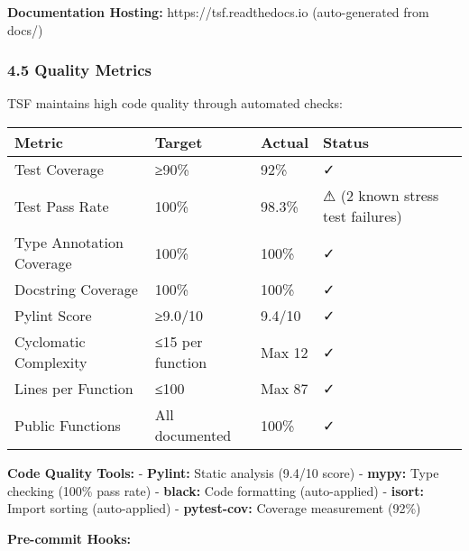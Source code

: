 \documentclass[
]{article}
\newcounter{none} %
\begin{document}
\textbf{Documentation Hosting:} https://tsf.readthedocs.io
(auto-generated from docs/)

\subsubsection{4.5 Quality Metrics}\label{quality-metrics}

TSF maintains high code quality through automated checks:

{\def\LTcaptype{none} %
\begin{longtable}[]{@{}llll@{}}
\toprule\noalign{}
Metric & Target & Actual & Status \\
\midrule\noalign{}
\endhead
\bottomrule\noalign{}
\endlastfoot
Test Coverage & ≥90\% & 92\% & ✓ \\
Test Pass Rate & 100\% & 98.3\% & ⚠ (2 known stress test failures) \\
Type Annotation Coverage & 100\% & 100\% & ✓ \\
Docstring Coverage & 100\% & 100\% & ✓ \\
Pylint Score & ≥9.0/10 & 9.4/10 & ✓ \\
Cyclomatic Complexity & ≤15 per function & Max 12 & ✓ \\
Lines per Function & ≤100 & Max 87 & ✓ \\
Public Functions & All documented & 100\% & ✓ \\
\end{longtable}
}

\textbf{Code Quality Tools:} - \textbf{Pylint:} Static analysis (9.4/10
score) - \textbf{mypy:} Type checking (100\% pass rate) -
\textbf{black:} Code formatting (auto-applied) - \textbf{isort:} Import
sorting (auto-applied) - \textbf{pytest-cov:} Coverage measurement
(92\%)

\textbf{Pre-commit Hooks:}
\end{document}
